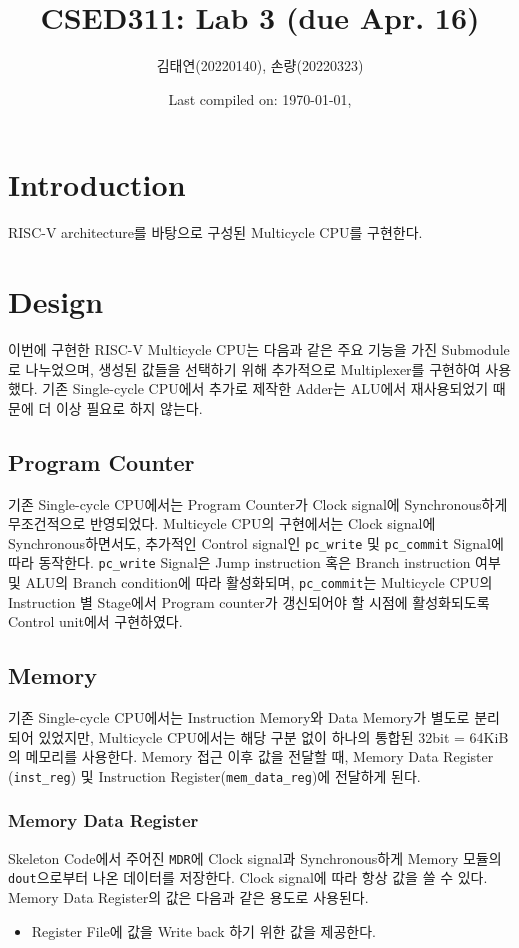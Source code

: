 \documentclass{scrartcl}
\title{CSED311: Lab 3 (due Apr. 16)}
\author{김태연(20220140), 손량(20220323)}
\date{Last compiled on: \today, \currenttime}
\begin{document}
\maketitle

\section{Introduction}
RISC-V architecture를 바탕으로 구성된 Multicycle CPU를 구현한다.

\section{Design}
이번에 구현한 RISC-V Multicycle CPU는 다음과 같은 주요 기능을 가진 Submodule로 나누었으며, 생성된 값들을 선택하기 위해
추가적으로 Multiplexer를 구현하여 사용했다. 기존 Single-cycle CPU에서 추가로 제작한 Adder는 ALU에서 재사용되었기 때문에
더 이상 필요로 하지 않는다.

\subsection{Program Counter}
기존 Single-cycle CPU에서는 Program Counter가 Clock signal에 Synchronous하게 무조건적으로 반영되었다.
Multicycle CPU의 구현에서는 Clock signal에 Synchronous하면서도, 추가적인 Control signal인
\texttt{pc\_write} 및 \texttt{pc\_commit} Signal에 따라 동작한다. \texttt{pc\_write} Signal은
Jump instruction 혹은 Branch instruction 여부 및 ALU의 Branch condition에 따라 활성화되며,
\texttt{pc\_commit}는 Multicycle CPU의 Instruction 별 Stage에서 Program counter가 갱신되어야 할
시점에 활성화되도록 Control unit에서 구현하였다.

\subsection{Memory}
기존 Single-cycle CPU에서는 Instruction Memory와 Data Memory가 별도로 분리되어 있었지만, Multicycle CPU에서는
해당 구분 없이 하나의 통합된 32bit = 64KiB의 메모리를 사용한다. Memory 접근 이후 값을 전달할 때, Memory
Data Register (\texttt{inst\_reg}) 및 Instruction Register(\texttt{mem\_data\_reg})에 전달하게 된다.

\subsubsection{Memory Data Register}
Skeleton Code에서 주어진 \texttt{MDR}에 Clock signal과 Synchronous하게 Memory 모듈의 \texttt{dout}으로부터
나온 데이터를 저장한다. Clock signal에 따라 항상 값을 쓸 수 있다.
Memory Data Register의 값은 다음과 같은 용도로 사용된다.
\begin{itemize}
  \item Register File에 값을 Write back 하기 위한 값을 제공한다.
\end{itemize}
\end{document}
